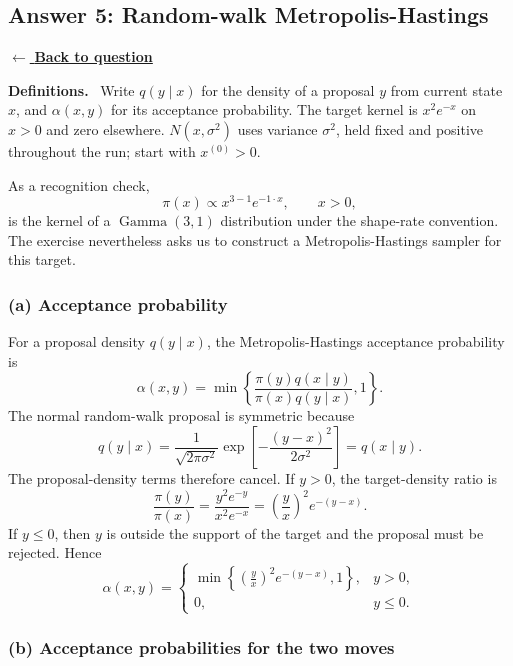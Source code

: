 \documentclass[11pt,a4paper]{article}
\newcommand{\given}{\mathrel{|}}
\newcommand{\answernav}[1]{%
  \label{answer:#1}%
  \noindent\hyperref[question:#1]{$\leftarrow$ \textbf{Back to question}}%
  \par\smallskip}
\newcommand{\studyheading}[1]{%
  \par\medskip\noindent\textcolor{statblue}{\textbf{#1.}}\ }
\begin{document}
\clearpage

\subsection{Answer 5: Random-walk Metropolis-Hastings}
\answernav{5}

\studyheading{Definitions}
Write $q(y\given x)$ for the density of a proposal $y$ from current state $x$, and $\alpha(x,y)$ for its acceptance probability.
The target kernel is $x^2e^{-x}$ on $x>0$ and zero elsewhere.
$N(x,\sigma^2)$ uses variance $\sigma^2$, held fixed and positive throughout the run; start with $x^{(0)}>0$.

As a recognition check,
\[
  \pi(x)\propto x^{3-1}e^{-1\cdot x},
  \qquad x>0,
\]
is the kernel of a $\operatorname{Gamma}(3,1)$ distribution under the
shape-rate convention. The exercise nevertheless asks us to construct a
Metropolis-Hastings sampler for this target.

\subsubsection*{(a) Acceptance probability}

For a proposal density $q(y\given x)$, the Metropolis-Hastings acceptance
probability is
\[
  \alpha(x,y)
  =\min\left\{
    \frac{\pi(y)q(x\given y)}{\pi(x)q(y\given x)},1
  \right\}.
\]
The normal random-walk proposal is symmetric because
\[
  q(y\given x)
  =\frac{1}{\sqrt{2\pi\sigma^2}}
   \exp\left[-\frac{(y-x)^2}{2\sigma^2}\right]
  =q(x\given y).
\]
The proposal-density terms therefore cancel. If $y>0$, the target-density
ratio is
\[
  \frac{\pi(y)}{\pi(x)}
  =\frac{y^2e^{-y}}{x^2e^{-x}}
  =\left(\frac{y}{x}\right)^2e^{-(y-x)}.
\]
If $y\leq0$, then $y$ is outside the support of the target and the proposal
must be rejected. Hence
\[
  \boxed{
    \alpha(x,y)
    =
    \begin{cases}
      \displaystyle
      \min\left\{
        \left(\frac{y}{x}\right)^2e^{-(y-x)},1
      \right\}, & y>0,\\[1.2em]
      0, & y\leq0.
    \end{cases}
  }
\]

\subsubsection*{(b) Acceptance probabilities for the two moves}
\end{document}
